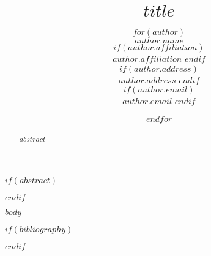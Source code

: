 \documentclass[a4paper]{article}
\title{$title$}
\author{
$for(author)$

$author.name$

$if(author.affiliation)$
 \\ $author.affiliation$
$endif$

$if(author.address)$
 \\ $author.address$
$endif$

$if(author.email)$
 \\ $author.email$
$endif$

\and

$endfor$
}
\begin{document}
\maketitle

$if(abstract)$
\begin{abstract}
$abstract$
\end{abstract}
$endif$

$body$


$if(bibliography)$

$endif$
\end{document}
